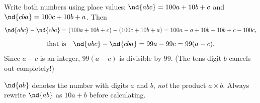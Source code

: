 {
Write both numbers using place values: $\nd{abc}=100a+10b+c$ and $\nd{cba}=100c+10b+a$. Then
\[\nd{abc}-\nd{cba}=(100a+10b+c)-(100c+10b+a)=100a-a+10b-10b+c-100c,\]
\[\text{that is}\quad\nd{abc}-\nd{cba}=99a-99c=99(a-c).\]
Since $a-c$ is an integer, $99(a-c)$ is divisible by $99$. (The tens digit $b$ cancels out completely!)
\begin{warnbox}$\nd{ab}$ denotes the number with digits $a$ and $b$, \emph{not} the product $a\times b$. Always rewrite $\nd{ab}$ as $10a+b$
before calculating.\end{warnbox}
}


